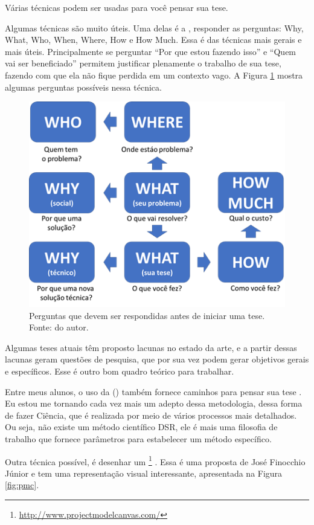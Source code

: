 Várias técnicas podem ser usadas para você pensar sua tese.

Algumas técnicas são muito úteis. Uma delas é a , responder as perguntas: Why, What, Who, When, Where, How e How Much. Essa é das técnicas mais gerais e mais úteis. Principalmente se perguntar “Por que estou fazendo isso” e “Quem vai ser beneficiado” permitem justificar plenamente o trabalho de sua tese, fazendo com que ela não fique perdida em um contexto vago.  A Figura \ref{fig:5w2h} mostra algumas perguntas possíveis nessa técnica.

\begin{figure}[hbt]
    \centering
    \includegraphics[width=0.7\linewidth]{Images/5w2h}
    \caption{Perguntas que devem ser respondidas antes de iniciar uma tese. Fonte: do autor.}
    \label{fig:5w2h}
\end{figure}




Algumas teses atuais têm proposto lacunas no estado da arte, e a partir dessas lacunas geram questões de pesquisa, que por sua vez podem gerar objetivos gerais e específicos. Esse é outro bom quadro teórico para trabalhar.

Entre meus alunos, o uso da  ()\citep{Pimentel2020} também fornece caminhos para pensar sua tese . Eu estou me tornando cada vez mais um adepto dessa metodologia, dessa forma de fazer Ciência, que é realizada por meio de vários processos mais detalhados. Ou seja, não existe um método científico DSR, ele é mais uma filosofia de trabalho que fornece parâmetros para estabelecer um método específico.



Outra técnica possível, é desenhar um \footnote{\url{http://www.projectmodelcanvas.com/}} . Essa é uma proposta de José Finocchio Júnior e tem uma representação visual interessante, apresentada na Figura \ref{fig:pmc}.

